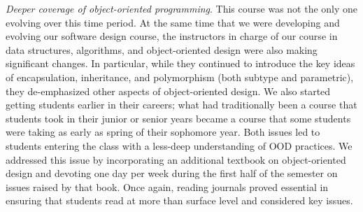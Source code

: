 \textit{Deeper coverage of object-oriented programming}.  This
course was not the only one evolving over this time period.  At the
same time that we were developing and evolving our software design
course, the instructors in charge of our course in data structures,
algorithms, and object-oriented design were also making significant
changes.  In particular, while they continued to introduce the key
ideas of encapsulation, inheritance, and polymorphism (both subtype
and parametric), they de-emphasized other aspects of object-oriented
design.  We also started getting students earlier in their careers;
what had traditionally been a course that students took in their
junior or senior years became a course that some students were
taking as early as spring of their sophomore year.  Both issues led
to students entering the class with a less-deep understanding of
OOD practices.  We addressed this issue by incorporating an additional
textbook on object-oriented design \cite{poodr} and devoting one day
per week during the first half of the semester on issues raised by that
book.  Once again, reading journals proved essential in ensuring that
students read at more than surface level and considered key issues.

